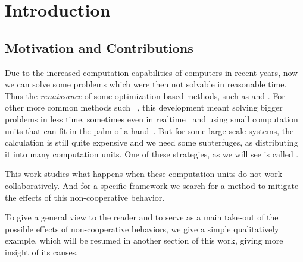 \documentclass[../main.tex]{subfiles}
\begin{document}
\chapter{Introduction}\label{cha:introduction}

%

\section{Motivation and Contributions}
Due to the increased computation capabilities of computers in recent years,
now we can solve some problems which were then not solvable in reasonable time.
Thus the \emph{renaissance} of some optimization based methods, such as  and .
For other more common methods such \mpc~\cite{GarciaEtAl1989}, this development meant solving bigger problems in less time, sometimes even in realtime~ and using small computation units that can fit in the palm of a hand~\cite{BanguraMahony2014}.
But for some large scale systems, the calculation is still quite expensive and we need some subterfuges, as distributing it into many computation units.
One of these strategies, as we will see is called \dmpc.

This work studies what happens when these computation units do not work collaboratively.
And for a specific \dmpc framework we search for a method to mitigate the effects of this non-cooperative behavior.

To give a general view to the reader and to serve as a main take-out of the possible effects of non-cooperative behaviors, we give a simple qualitatively example, which will be resumed in another section of this work, giving more insight of its causes.
\end{document}
